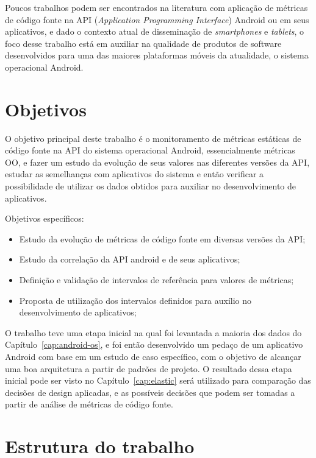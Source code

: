 Poucos trabalhos podem ser encontrados na literatura com aplicação de métricas de código fonte na API (\textit{Application Programming Interface}) Android ou em seus aplicativos, e dado o contexto atual de disseminação de \textit{smartphones} e \textit{tablets}, o foco desse trabalho está em auxiliar na qualidade de produtos de software desenvolvidos para uma das maiores plataformas móveis da atualidade, o sistema operacional Android. 

\section{Objetivos}

O objetivo principal deste trabalho é o monitoramento de métricas estáticas de código fonte na API do sistema operacional Android, essencialmente métricas OO, e fazer um estudo da evolução de seus valores nas diferentes versões da API, estudar as semelhanças com aplicativos do sistema e então verificar a possibilidade de utilizar os dados obtidos para auxiliar no desenvolvimento de aplicativos.

Objetivos específicos:
\begin{itemize}
\item Estudo da evolução de métricas de código fonte em diversas versões da API;
\item Estudo da correlação da API android e de seus aplicativos;
\item Definição e validação de intervalos de referência para valores de métricas;
\item Proposta de utilização dos intervalos definidos para auxílio no desenvolvimento de aplicativos;
\end{itemize}

O trabalho teve uma etapa inicial na qual foi levantada a maioria dos dados do Capítulo~\ref{cap:android-os}, e foi então desenvolvido um pedaço de um aplicativo Android com base em um estudo de caso específico, com o objetivo de alcançar uma boa arquitetura a partir de padrões de projeto. O resultado dessa etapa inicial pode ser visto no Capítulo~\ref{cap:elastic} será utilizado para comparação das decisões de design aplicadas, e as possíveis decisões que podem ser tomadas a partir de análise de métricas de código fonte.

\section{Estrutura do trabalho}

